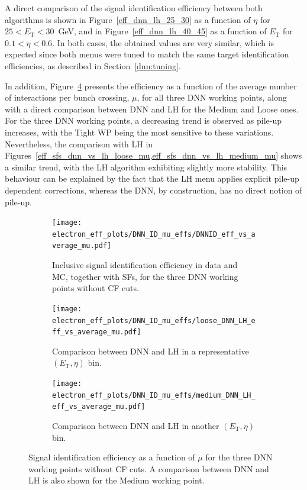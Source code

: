 A direct comparison of the signal identification efficiency between both algorithms is shown in Figure~\ref{eff_dnn_lh_25_30} as a function of $\eta$ for $25 < E_{\mathrm{T}} < 30$~GeV, and in Figure~\ref{eff_dnn_lh_40_45} as a function of $E_{\mathrm{T}}$ for $0.1 < \eta < 0.6$. In both cases, the obtained values are very similar, which is expected since both menus were tuned to match the same target identification efficiencies, as described in Section~\ref{dnn:tuning}.

In addition, Figure~\ref{fig:eff_sfs_dnn_vs_lh_mu} presents the efficiency as a function of the average number of interactions per bunch crossing, $\mu$, for all three DNN working points, along with a direct comparison between DNN and LH for the Medium and Loose ones. For the three DNN working points, a decreasing trend is observed as pile-up increases, with the Tight WP being the most sensitive to these variations. Nevertheless, the comparison with LH in Figures~\ref{eff_sfs_dnn_vs_lh_loose_mu,eff_sfs_dnn_vs_lh_medium_mu} shows a similar trend, with the LH algorithm exhibiting slightly more stability. This behaviour can be explained by the fact that the LH menu applies explicit pile-up dependent corrections, whereas the DNN, by construction, has no direct notion of pile-up.

\begin{figure}[htbp]
  \centering
  \begin{subfigure}{0.70\textwidth}
    \centering
    \texttt{[image: electron\_eff\_plots/DNN\_ID\_mu\_effs/DNNID\_eff\_vs\_average\_mu.pdf]}
    \caption{Inclusive signal identification efficiency in data and MC, together with SFs, for the three DNN working points without CF cuts.}
    \label{fig:eff_sfs_dnn_mu}
  \end{subfigure}

  \vspace{0.6cm}

  \begin{subfigure}{0.48\textwidth}
    \centering
    \texttt{[image: electron\_eff\_plots/DNN\_ID\_mu\_effs/loose\_DNN\_LH\_eff\_vs\_average\_mu.pdf]}
    \caption{Comparison between DNN and LH in a representative $(E_{\mathrm{T}},\eta)$ bin.}
    \label{fig:eff_sfs_dnn_vs_lh_loose_mu}
  \end{subfigure}
  \hfill
  \begin{subfigure}{0.48\textwidth}
    \centering
    \texttt{[image: electron\_eff\_plots/DNN\_ID\_mu\_effs/medium\_DNN\_LH\_eff\_vs\_average\_mu.pdf]}
    \caption{Comparison between DNN and LH in another $(E_{\mathrm{T}},\eta)$ bin.}
    \label{fig:eff_sfs_dnn_vs_lh_medium_mu}
  \end{subfigure}

  \caption{Signal identification efficiency as a function of $\mu$ for the three DNN working points without CF cuts. A comparison between DNN and LH is also shown for the Medium working point.}
  \label{fig:eff_sfs_dnn_vs_lh_mu}
\end{figure}


